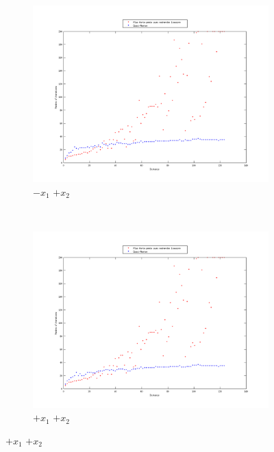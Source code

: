 \documentclass[11pt,a4paper,twoside,onecolumn,titlepage]{report}
\begin{document}
\begin{enumerate}[(a)]
\begin{figure}[h!]
    \centering
	\begin{subfigure}[t]{0.5\textwidth}
		\centering
		\includegraphics[scale=0.4]{methods-quarter-4}
		\caption{$-x_1$ $+x_2$}
		\label{fig:awesome_image}
	\end{subfigure}%
        ~ %
    \begin{subfigure}[t]{0.5\textwidth}
		\centering
		\includegraphics[scale=0.4]{methods-quarter-3}
		\caption{$+x_1$ $+x_2$}
		\label{fig:awesome_image}
	\end{subfigure}


\end{figure}
\end{enumerate}
\end{document}
